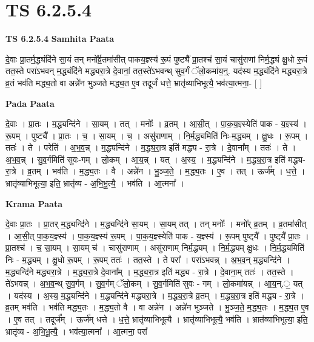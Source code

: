 \documentclass[17pt]{extarticle}
\begin{document}
\section{ TS 6.2.5.4 }

\textbf{TS 6.2.5.4 } \newline
\textbf{Samhita Paata} \newline

दे॒वाः प्रा॒तर्म॒द्ध्यंदि॑ने सा॒यं तन् मनो᳚र्व्र॒तमा॑सीत् पाकय॒ज्ञ्स्य॑ रू॒पं पुष्ट्यै᳚ प्रा॒तश्च॑ सा॒यं चासु॑राणां निर्म॒द्ध्यं क्षु॒धो रू॒पं तत॒स्ते परा॑ऽभवन् म॒द्ध्यंदि॑ने मद्ध्यरा॒त्रे दे॒वानां॒ तत॒स्ते॑ऽभवन्थ् सुव॒र्गं ॅलो॒कमा॑य॒न्॒. यद॑स्य म॒द्ध्यंदि॑ने मद्ध्यरा॒त्रे व्र॒तं भव॑ति मद्ध्य॒तो वा अन्ने॑न भुञ्जते मद्ध्य॒त ए॒व तदूर्जं॑ धत्ते॒ भ्रातृ॑व्याभिभूत्यै॒ भव॑त्या॒त्मना॒- [  ] \newline

\textbf{Pada Paata} \newline

दे॒वाः । प्रा॒तः । म॒द्ध्यन्दि॑ने । सा॒यम् । तत् । मनोः᳚ । व्र॒तम् । आ॒सी॒त् । पा॒क॒य॒ज्ञ्स्येति॑ पाक - य॒ज्ञ्स्य॑ । रू॒पम् । पुष्ट्यै᳚ । प्रा॒तः । च॒ । सा॒यम् । च॒ । असु॑राणाम् । नि॒र्म॒द्ध्यमिति॑ निः-म॒द्ध्यम् । क्षु॒धः । रू॒पम् । ततः॑ । ते । परेति॑ । अ॒भ॒व॒न्न् । म॒द्ध्यन्दि॑ने । म॒द्ध्य॒रा॒त्र इति॑ मद्ध्य - रा॒त्रे । दे॒वाना᳚म् । ततः॑ । ते । अ॒भ॒व॒न्न् । सु॒व॒र्गमिति॑ सुवः-गम् । लो॒कम् । आ॒य॒न्न् । यत् । अ॒स्य॒ । म॒द्ध्यन्दि॑ने । म॒द्ध्य॒रा॒त्र इति॑ मद्ध्य-रा॒त्रे । व्र॒तम् । भव॑ति । म॒द्ध्य॒तः । वै । अन्ने॑न । भु॒ञ्ज॒ते॒ । म॒द्ध्य॒तः । ए॒व । तत् । ऊर्ज᳚म् । ध॒त्ते॒ । भ्रातृ॑व्याभिभूत्या॒ इति॒ भ्रातृ॑व्य - अ॒भि॒भू॒त्यै॒ । भव॑ति । आ॒त्मना᳚ ।  \newline


\textbf{Krama Paata} \newline

दे॒वाः प्रा॒तः । प्रा॒तर् म॒द्ध्यन्दि॑ने । म॒द्ध्यन्दि॑ने सा॒यम् । सा॒यम् तत् । तन् मनोः᳚ । मनो᳚र् व्र॒तम् । व्र॒तमा॑सीत् । आ॒सी॒त् पा॒क॒य॒ज्ञ्स्य॑ । पा॒क॒य॒ज्ञ्स्य॑ रू॒पम् । पा॒क॒य॒ज्ञ्स्येति॑ पाक - य॒ज्ञ्स्य॑ । रू॒पम् पुष्ट्‍यै᳚ । पुष्ट्‍यै᳚ प्रा॒तः । प्रा॒तश्च॑ । च॒ सा॒यम् । सा॒यम् च॑ । चासु॑राणाम् । असु॑राणाम् निर्म॒द्ध्यम् । नि॒र्म॒द्ध्यम् क्षु॒धः । नि॒र्म॒द्ध्यमिति॑ निः - म॒द्ध्यम् । क्षु॒धो रू॒पम् । रू॒पम् ततः॑ । तत॒स्ते । ते परा᳚ । परा॑ऽभवन्न् । अ॒भ॒व॒न् म॒द्ध्यन्दि॑ने । म॒द्ध्यन्दि॑ने मद्ध्यरा॒त्रे । म॒द्ध्य॒रा॒त्रे दे॒वाना᳚म् । म॒द्ध्य॒रा॒त्र इति॑ मद्ध्य - रा॒त्रे । दे॒वाना॒म् ततः॑ । तत॒स्ते । ते॑ऽभवन्न् । अ॒भ॒व॒न्थ् सु॒व॒र्गम् । सु॒व॒र्गम् ॅलो॒कम् । सु॒व॒र्गमिति॑ सुवः - गम् । लो॒कमा॑यन्न् । आ॒य॒न्.॒ यत् । यद॑स्य । अ॒स्य॒ म॒द्ध्यन्दि॑ने । म॒द्ध्यन्दि॑ने मद्ध्यरा॒त्रे । म॒द्ध्य॒रा॒त्रे व्र॒तम् । म॒द्ध्य॒रा॒त्र इति॑ मद्ध्य - रा॒त्रे । व्र॒तम् भव॑ति । भव॑ति मद्ध्य॒तः । म॒द्ध्य॒तो वै । वा अन्ने॑न । अन्ने॑न भुञ्जते । भु॒ञ्ज॒ते॒ म॒द्ध्य॒तः । म॒द्ध्य॒त ए॒व । ए॒व तत् । तदूर्ज᳚म् । ऊर्ज॑म् धत्ते । ध॒त्ते॒ भ्रातृ॑व्याभिभूत्यै । भ्रातृ॑व्याभिभूत्यै॒ भव॑ति । भ्रात॑व्याभिभूत्या॒ इति॒ भ्रातृ॑व्य - अ॒भि॒भू॒त्यै॒ । भव॑त्या॒त्मना᳚ । आ॒त्मना॒ परा᳚ \newline
\end{document}
